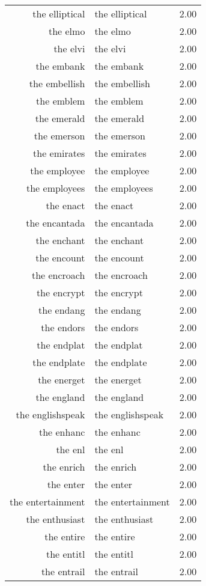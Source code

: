 \begin{table}[ht]
\begin{tabular}{rlr}
  the elliptical & the elliptical & 2.00 \\ 
  the elmo & the elmo & 2.00 \\ 
  the elvi & the elvi & 2.00 \\ 
  the embank & the embank & 2.00 \\ 
  the embellish & the embellish & 2.00 \\ 
  the emblem & the emblem & 2.00 \\ 
  the emerald & the emerald & 2.00 \\ 
  the emerson & the emerson & 2.00 \\ 
  the emirates & the emirates & 2.00 \\ 
  the employee & the employee & 2.00 \\ 
  the employees & the employees & 2.00 \\ 
  the enact & the enact & 2.00 \\ 
  the encantada & the encantada & 2.00 \\ 
  the enchant & the enchant & 2.00 \\ 
  the encount & the encount & 2.00 \\ 
  the encroach & the encroach & 2.00 \\ 
  the encrypt & the encrypt & 2.00 \\ 
  the endang & the endang & 2.00 \\ 
  the endors & the endors & 2.00 \\ 
  the endplat & the endplat & 2.00 \\ 
  the endplate & the endplate & 2.00 \\ 
  the energet & the energet & 2.00 \\ 
  the england & the england & 2.00 \\ 
  the englishspeak & the englishspeak & 2.00 \\ 
  the enhanc & the enhanc & 2.00 \\ 
  the enl & the enl & 2.00 \\ 
  the enrich & the enrich & 2.00 \\ 
  the enter & the enter & 2.00 \\ 
  the entertainment & the entertainment & 2.00 \\ 
  the enthusiast & the enthusiast & 2.00 \\ 
  the entire & the entire & 2.00 \\ 
  the entitl & the entitl & 2.00 \\ 
  the entrail & the entrail & 2.00 \\ 

\end{tabular}
\end{table}
